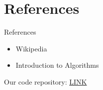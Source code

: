 \section{References}

\begin{frame}{References}

    \begin{itemize}
        \item Wikipedia
        \item Introduction to Algorithms
    \end{itemize}

    Our code repository: \href{https://github.com/tigert1998/simplex-method}{LINK}

\end{frame}